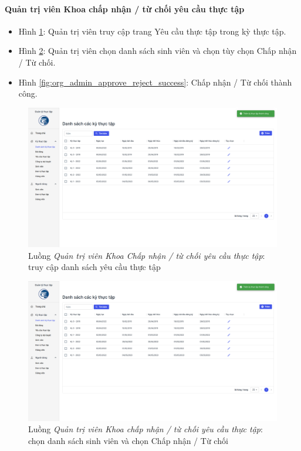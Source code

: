 \documentclass[./../main.tex]{subfiles}
\begin{document}
\paragraph*{Quản trị viên Khoa chấp nhận / từ chối yêu cầu thực tập}

\begin{itemize}
	\item Hình \ref{fig:org_admin_access_list_requests}: Quản trị viên truy cập trang Yêu cầu thực tập trong kỳ thực tập. 
	\item Hình \ref{fig:org_admin_select_requests}: Quản trị viên chọn danh sách sinh viên và chọn tùy chọn Chấp nhận / Từ chối.
	\item Hình \ref{fig:org_admin_approve_reject_success}: Chấp nhận / Từ chối thành công.
\end{itemize}

\begin{figure}[]
	\includegraphics[width=\linewidth]{./images/image55.png} %
	\caption{Luồng \emph{Quản trị viên Khoa Chấp nhận / từ chối yêu cầu thực tập}: truy cập danh sách yêu cầu thực tập}
	\label{fig:org_admin_access_list_requests}
\end{figure}

\begin{figure}[]
	\includegraphics[width=\linewidth]{./images/image55.png} %
	\caption{Luồng \emph{Quản trị viên Khoa chấp nhận / từ chối yêu cầu thực tập}: chọn danh sách sinh viên và chọn Chấp nhận / Từ chối}
	\label{fig:org_admin_select_requests}
\end{figure}
\end{document}
